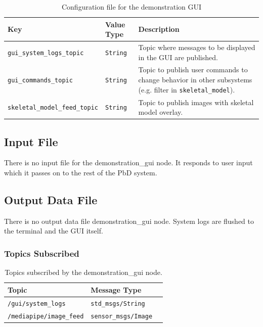 \documentclass{CSSRforAfrica}
\begin{document}
\begin{longtable}[c]{|l|l|p{7cm}|}
    \caption{Configuration file for the demonstration GUI} \label{tab:config_file}\\
    \hline
    \rowcolor{gray!30}
    \small{\textbf{Key}} & \small{\textbf{Value Type}} & \small{\textbf{Description}} \\ \hline
    \endhead %
    \small{\texttt{gui\_system\_logs\_topic}} & \small{\texttt{String}} & \small{Topic where messages to be displayed in the GUI are published.} \\ \hline
    \small{\texttt{gui\_commands\_topic}} & \small{\texttt{String}} & \small{Topic to publish user commands to change behavior in other subsystems (e.g. filter in \texttt{skeletal\_model}).} \\ \hline
    \small{\texttt{skeletal\_model\_feed\_topic}} & \small{\texttt{String}} & \small{Topic to publish images with skeletal model overlay.} \\ \hline
\end{longtable}

\subsection*{Input File}
There is no input file for the demonstration\_gui node. It responds to user input which it passes on to the rest of the PbD system. 

\subsection*{Output Data File}
There is no output data file demonstration\_gui node. System logs are flushed to the terminal and the GUI itself.

\subsubsection*{Topics Subscribed}
\begin{longtable}[c]{|l|l|l|}
    \caption{Topics subscribed by the demonstration\_gui node.} \label{tab:Published_topics} \\
    \hline
    \rowcolor{gray!30}
    \footnotesize{\textbf{Topic}} & \footnotesize{\textbf{Message Type}} \\ \hline
    \endhead %
    
    \footnotesize{\texttt{/gui/system\_logs}} & \footnotesize{\texttt{std\_msgs/String}} \\ \hline
    \footnotesize{\texttt{/mediapipe/image\_feed}} & \footnotesize{\texttt{sensor\_msgs/Image}} \\ \hline
    

\end{longtable}
\end{document}
